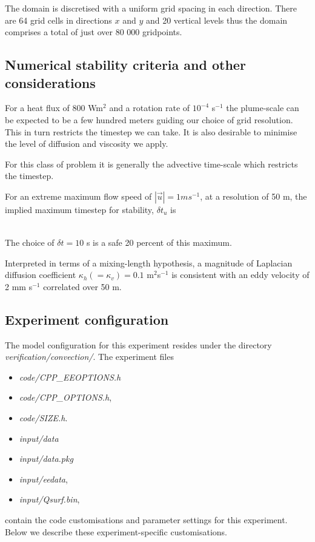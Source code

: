 The domain is discretised with a uniform grid spacing in each direction. There are 64
grid cells in directions $x$ and $y$ and 20 vertical levels thus the domain
comprises a total of just over 80 000 gridpoints.

\subsection{Numerical stability criteria and other considerations}
\label{www:tutorials}

For a heat flux of 800 Wm$^2$ and a rotation rate of $10^{-4}$ s$^{-1}$ the
plume-scale can be expected to be a few hundred meters guiding our choice of grid
resolution. This in turn restricts the timestep we can take. It is also desirable to 
minimise the level of diffusion and viscosity we apply.

For this class of problem it is generally the advective time-scale which restricts 
the timestep. 

For an extreme maximum flow speed of $ | \vec{u} | = 1 ms^{-1}$, at a resolution of
50 m, the implied maximum timestep for stability, $\delta t_u$ is 

\begin{eqnarray}
\label{EQ:eg-bconv-advectiveCFLcondition}
\end{eqnarray}

The choice of $\delta t = 10$ s is a safe 20 percent of this maximum.
 
Interpreted in terms of a mixing-length hypothesis, a magnitude of Laplacian
diffusion coefficient $\kappa_h (=
\kappa_v) = 0.1$ m$^2$s$^{-1}$ is consistent with an eddy velocity of 2 mm s$^{-1}$
correlated over 50 m.  

\subsection{Experiment configuration}
\label{www:tutorials}

The model configuration for this experiment resides under the directory
{\it verification/convection/}. The experiment files
\begin{itemize}
\item {\it code/CPP\_EEOPTIONS.h}
\item {\it code/CPP\_OPTIONS.h},
\item {\it code/SIZE.h}. 
\item {\it input/data}
\item {\it input/data.pkg}
\item {\it input/eedata},
\item {\it input/Qsurf.bin},
\end{itemize}
contain the code customisations and parameter settings for this 
experiment. Below we describe these experiment-specific customisations.

